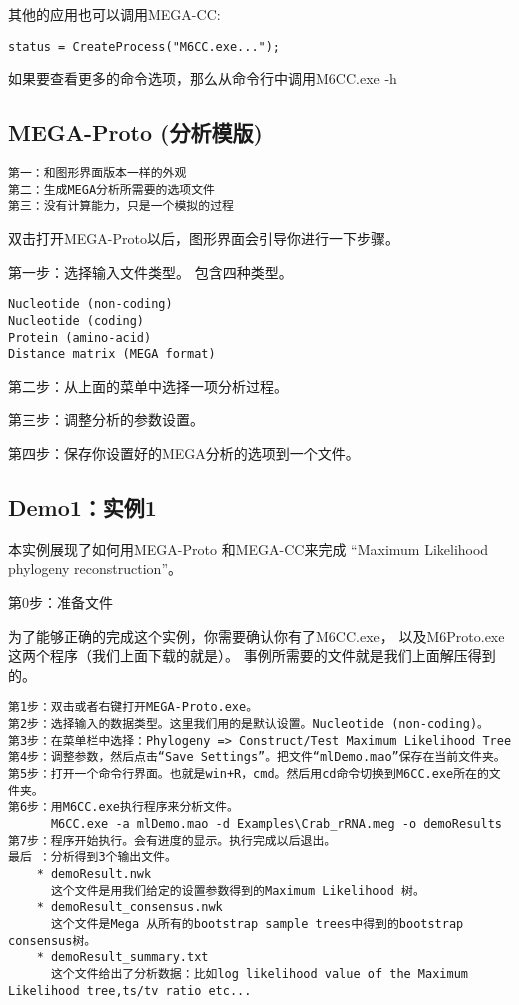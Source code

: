 \documentclass[11pt]{ctexart}
\begin{document}
其他的应用也可以调用MEGA-CC:

\begin{verbatim}
status = CreateProcess("M6CC.exe...");
\end{verbatim}
如果要查看更多的命令选项，那么从命令行中调用M6CC.exe -h
\subsection{MEGA-Proto (分析模版)}
\label{sec-3-5}


\begin{verbatim}
第一：和图形界面版本一样的外观
第二：生成MEGA分析所需要的选项文件
第三：没有计算能力，只是一个模拟的过程
\end{verbatim}
双击打开MEGA-Proto以后，图形界面会引导你进行一下步骤。

第一步：选择输入文件类型。
包含四种类型。

\begin{verbatim}
Nucleotide (non-coding)
Nucleotide (coding)
Protein (amino-acid)
Distance matrix (MEGA format)
\end{verbatim}

第二步：从上面的菜单中选择一项分析过程。

第三步：调整分析的参数设置。

第四步：保存你设置好的MEGA分析的选项到一个文件。
\subsection{Demo1：实例1}
\label{sec-3-6}

本实例展现了如何用MEGA-Proto 和MEGA-CC来完成
“Maximum Likelihood phylogeny reconstruction”。

第0步：准备文件

为了能够正确的完成这个实例，你需要确认你有了M6CC.exe，
以及M6Proto.exe这两个程序（我们上面下载的就是）。
事例所需要的文件就是我们上面解压得到的。

\begin{verbatim}
第1步：双击或者右键打开MEGA-Proto.exe。
第2步：选择输入的数据类型。这里我们用的是默认设置。Nucleotide (non-coding)。
第3步：在菜单栏中选择：Phylogeny => Construct/Test Maximum Likelihood Tree
第4步：调整参数，然后点击“Save Settings”。把文件“mlDemo.mao”保存在当前文件夹。
第5步：打开一个命令行界面。也就是win+R，cmd。然后用cd命令切换到M6CC.exe所在的文件夹。
第6步：用M6CC.exe执行程序来分析文件。
      M6CC.exe -a mlDemo.mao -d Examples\Crab_rRNA.meg -o demoResults
第7步：程序开始执行。会有进度的显示。执行完成以后退出。
最后 ：分析得到3个输出文件。
    * demoResult.nwk
      这个文件是用我们给定的设置参数得到的Maximum Likelihood 树。
    * demoResult_consensus.nwk
      这个文件是Mega 从所有的bootstrap sample trees中得到的bootstrap consensus树。
    * demoResult_summary.txt
      这个文件给出了分析数据：比如log likelihood value of the Maximum Likelihood tree,ts/tv ratio etc...
\end{verbatim}
\end{document}
